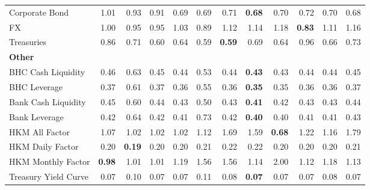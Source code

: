 \begin{tabular}{@{}lrrrrrrrrrrr@{}}
Corporate Bond & 1.01 & 0.93 & 0.91 & 0.69 & 0.69 & 0.71 & \textbf{0.68} & 0.70 & 0.72 & 0.70 & 0.68 \\
FX & 1.00 & 0.95 & 0.95 & 1.03 & 0.89 & 1.12 & 1.14 & 1.18 & \textbf{0.83} & 1.11 & 1.16 \\
Treasuries & 0.86 & 0.71 & 0.60 & 0.64 & 0.59 & \textbf{0.59} & 0.69 & 0.64 & 0.96 & 0.66 & 0.73 \\
\midrule
\multicolumn{12}{l}{\textbf{Other}} \\
BHC Cash Liquidity & 0.46 & 0.63 & 0.45 & 0.44 & 0.53 & 0.44 & \textbf{0.43} & 0.43 & 0.44 & 0.44 & 0.45 \\
BHC Leverage & 0.37 & 0.61 & 0.37 & 0.36 & 0.55 & 0.36 & \textbf{0.35} & 0.35 & 0.36 & 0.36 & 0.37 \\
Bank Cash Liquidity & 0.45 & 0.60 & 0.44 & 0.43 & 0.50 & 0.43 & \textbf{0.41} & 0.42 & 0.43 & 0.43 & 0.44 \\
Bank Leverage & 0.42 & 0.64 & 0.42 & 0.41 & 0.73 & 0.42 & \textbf{0.40} & 0.40 & 0.41 & 0.41 & 0.43 \\
HKM All Factor & 1.07 & 1.02 & 1.02 & 1.02 & 1.12 & 1.69 & 1.59 & \textbf{0.68} & 1.22 & 1.16 & 1.79 \\
HKM Daily Factor & 0.20 & \textbf{0.19} & 0.20 & 0.20 & 0.21 & 0.22 & 0.22 & 0.20 & 0.20 & 0.20 & 0.21 \\
HKM Monthly Factor & \textbf{0.98} & 1.01 & 1.01 & 1.19 & 1.56 & 1.56 & 1.14 & 2.00 & 1.12 & 1.18 & 1.13 \\
Treasury Yield Curve & 0.07 & 0.10 & 0.07 & 0.07 & 0.11 & 0.08 & \textbf{0.07} & 0.07 & 0.07 & 0.08 & 0.07 \\
\bottomrule
\end{tabular}